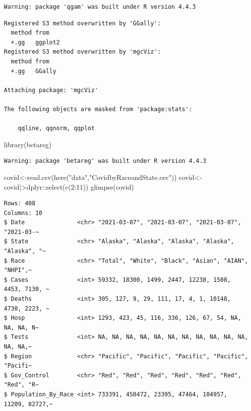 \documentclass[
  letterpaper,
  DIV=11,
  numbers=noendperiod]{scrartcl}
\newenvironment{Shaded}{\begin{snugshade}}{\end{snugshade}}
\newcommand{\DecValTok}[1]{\textcolor[rgb]{0.68,0.00,0.00}{#1}}
\newcommand{\FunctionTok}[1]{\textcolor[rgb]{0.28,0.35,0.67}{#1}}
\newcommand{\NormalTok}[1]{\textcolor[rgb]{0.00,0.23,0.31}{#1}}
\newcommand{\OtherTok}[1]{\textcolor[rgb]{0.00,0.23,0.31}{#1}}
\newcommand{\SpecialCharTok}[1]{\textcolor[rgb]{0.37,0.37,0.37}{#1}}
\newcommand{\StringTok}[1]{\textcolor[rgb]{0.13,0.47,0.30}{#1}}
\begin{document}
\begin{verbatim}
Warning: package 'qgam' was built under R version 4.4.3
\end{verbatim}

\begin{verbatim}
Registered S3 method overwritten by 'GGally':
  method from   
  +.gg   ggplot2
Registered S3 method overwritten by 'mgcViz':
  method from  
  +.gg   GGally

Attaching package: 'mgcViz'

The following objects are masked from 'package:stats':

    qqline, qqnorm, qqplot
\end{verbatim}

\begin{Shaded}
\begin{Highlighting}[]
\FunctionTok{library}\NormalTok{(betareg)}
\end{Highlighting}
\end{Shaded}

\begin{verbatim}
Warning: package 'betareg' was built under R version 4.4.3
\end{verbatim}

\begin{Shaded}
\begin{Highlighting}[]
\NormalTok{covid}\OtherTok{\textless{}{-}}\FunctionTok{read.csv}\NormalTok{(}\FunctionTok{here}\NormalTok{(}\StringTok{"data"}\NormalTok{,}\StringTok{"CovidbyRaceandState.csv"}\NormalTok{))}
\NormalTok{covid}\OtherTok{\textless{}{-}}\NormalTok{covid}\SpecialCharTok{|\textgreater{}}\NormalTok{dplyr}\SpecialCharTok{::}\FunctionTok{select}\NormalTok{(}\FunctionTok{c}\NormalTok{(}\DecValTok{2}\SpecialCharTok{:}\DecValTok{11}\NormalTok{))}
\FunctionTok{glimpse}\NormalTok{(covid)}
\end{Highlighting}
\end{Shaded}

\begin{verbatim}
Rows: 408
Columns: 10
$ Date               <chr> "2021-03-07", "2021-03-07", "2021-03-07", "2021-03-~
$ State              <chr> "Alaska", "Alaska", "Alaska", "Alaska", "Alaska", "~
$ Race               <chr> "Total", "White", "Black", "Asian", "AIAN", "NHPI",~
$ Cases              <int> 59332, 18300, 1499, 2447, 12238, 1508, 4453, 7130, ~
$ Deaths             <int> 305, 127, 9, 29, 111, 17, 4, 1, 10148, 4730, 2223, ~
$ Hosp               <int> 1293, 423, 45, 116, 336, 126, 67, 54, NA, NA, NA, N~
$ Tests              <int> NA, NA, NA, NA, NA, NA, NA, NA, NA, NA, NA, NA, NA,~
$ Region             <chr> "Pacific", "Pacific", "Pacific", "Pacific", "Pacifi~
$ Gov_Control        <chr> "Red", "Red", "Red", "Red", "Red", "Red", "Red", "R~
$ Population_By_Race <int> 733391, 450472, 23395, 47464, 104957, 11209, 82727,~
\end{verbatim}
\end{document}
